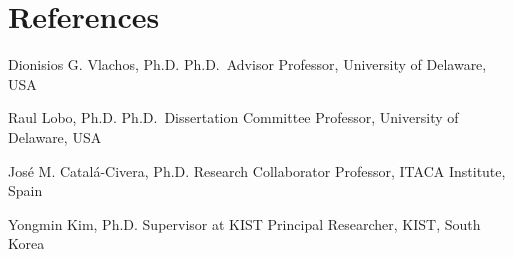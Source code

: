 \section{References}
\begin{cvplain}
  \item Dionisios G. Vlachos, Ph.D. \textbar{} Ph.D.\ Advisor \textbar{} Professor, University
        of Delaware, USA
  \item Raul Lobo, Ph.D. \textbar{} Ph.D.\ Dissertation Committee \textbar{} Professor,
        University of Delaware, USA
  \item José M. Catalá-Civera, Ph.D. \textbar{} Research Collaborator \textbar{} Professor,
        ITACA Institute, Spain
  \item Yongmin Kim, Ph.D. \textbar{} Supervisor at KIST \textbar{} Principal Researcher,
        KIST, South Korea
\end{cvplain}


